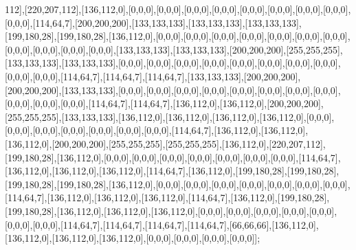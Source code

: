 112],[220,207,112],[136,112,0],[0,0,0],[0,0,0],[0,0,0],[0,0,0],[0,0,0],[0,0,0],[0,0,0],[0,0,0],[0,0,0],[114,64,7],[200,200,200],[133,133,133],[133,133,133],[133,133,133],[199,180,28],[199,180,28],[136,112,0],[0,0,0],[0,0,0],[0,0,0],[0,0,0],[0,0,0],[0,0,0],[0,0,0],[0,0,0],[0,0,0],[0,0,0],[0,0,0],[133,133,133],[133,133,133],[200,200,200],[255,255,255],[133,133,133],[133,133,133],[0,0,0],[0,0,0],[0,0,0],[0,0,0],[0,0,0],[0,0,0],[0,0,0],[0,0,0],[0,0,0],[0,0,0],[114,64,7],[114,64,7],[114,64,7],[133,133,133],[200,200,200],[200,200,200],[133,133,133],[0,0,0],[0,0,0],[0,0,0],[0,0,0],[0,0,0],[0,0,0],[0,0,0],[0,0,0],[0,0,0],[0,0,0],[0,0,0],[114,64,7],[114,64,7],[136,112,0],[136,112,0],[200,200,200],[255,255,255],[133,133,133],[136,112,0],[136,112,0],[136,112,0],[136,112,0],[0,0,0],[0,0,0],[0,0,0],[0,0,0],[0,0,0],[0,0,0],[0,0,0],[114,64,7],[136,112,0],[136,112,0],[136,112,0],[200,200,200],[255,255,255],[255,255,255],[136,112,0],[220,207,112],[199,180,28],[136,112,0],[0,0,0],[0,0,0],[0,0,0],[0,0,0],[0,0,0],[0,0,0],[0,0,0],[114,64,7],[136,112,0],[136,112,0],[136,112,0],[114,64,7],[136,112,0],[199,180,28],[199,180,28],[199,180,28],[199,180,28],[136,112,0],[0,0,0],[0,0,0],[0,0,0],[0,0,0],[0,0,0],[0,0,0],[0,0,0],[114,64,7],[136,112,0],[136,112,0],[136,112,0],[114,64,7],[136,112,0],[199,180,28],[199,180,28],[136,112,0],[136,112,0],[136,112,0],[0,0,0],[0,0,0],[0,0,0],[0,0,0],[0,0,0],[0,0,0],[0,0,0],[114,64,7],[114,64,7],[114,64,7],[114,64,7],[66,66,66],[136,112,0],[136,112,0],[136,112,0],[136,112,0],[0,0,0],[0,0,0],[0,0,0],[0,0,0]];

